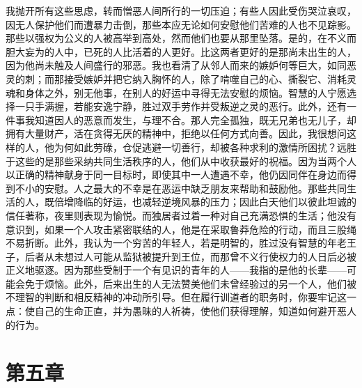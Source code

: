我抛开所有这些思虑，转而憎恶人间所行的一切压迫；有些人因此受伤哭泣哀叹，因无人保护他们而遭暴力击倒，那些本应无论如何安慰他们苦难的人也不见踪影。那些以强权为公义的人被高举到高处，然而他们也要从那里坠落。是的，在不义而胆大妄为的人中，已死的人比活着的人更好。比这两者更好的是那尚未出生的人，因为他尚未触及人间盛行的邪恶。我也看清了从邻人而来的嫉妒何等巨大，如同恶灵的刺；而那接受嫉妒并把它纳入胸怀的人，除了啃噬自己的心、撕裂它、消耗灵魂和身体之外，别无他事，在别人的好运中寻得无法安慰的烦恼。智慧的人宁愿选择一只手满握，若能安逸宁静，胜过双手劳作并受叛逆之灵的恶行。此外，还有一件事我知道因人的恶意而发生，与理不合。那人完全孤独，既无兄弟也无儿子，却拥有大量财产，活在贪得无厌的精神中，拒绝以任何方式向善。因此，我很想问这样的人，他为何如此劳碌，仓促逃避一切善行，却被各种求利的激情所困扰？远胜于这些的是那些采纳共同生活秩序的人，他们从中收获最好的祝福。因为当两个人以正确的精神献身于同一目标时，即使其中一人遭遇不幸，他仍因同伴在身边而得到不小的安慰。人之最大的不幸是在恶运中缺乏朋友来帮助和鼓励他。那些共同生活的人，既倍增降临的好运，也减轻逆境风暴的压力；因此白天他们以彼此坦诚的信任著称，夜里则表现为愉悦。而独居者过着一种对自己充满恐惧的生活；他没有意识到，如果一个人攻击紧密联结的人，他是在采取鲁莽危险的行动，而且三股绳不易折断。此外，我认为一个穷苦的年轻人，若是明智的，胜过没有智慧的年老王子，后者从未想过人可能从监狱被提升到王位，而那曾不义行使权力的人日后必被正义地驱逐。因为那些受制于一个有见识的青年的人——我指的是他的长辈——可能会免于烦恼。此外，后来出生的人无法赞美他们未曾经验过的另一个人，他们被不理智的判断和相反精神的冲动所引导。但在履行训道者的职务时，你要牢记这一点：使自己的生命正直，并为愚昧的人祈祷，使他们获得理解，知道如何避开恶人的行为。\par


\section{第五章}


